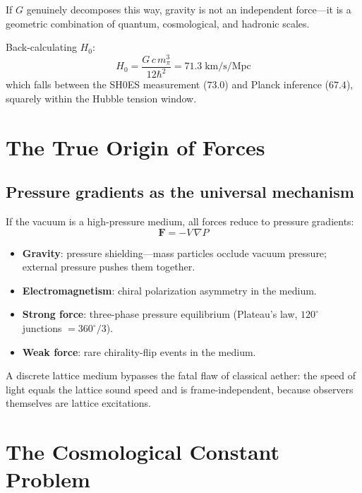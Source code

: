 \documentclass[12pt,a4paper,twocolumn]{article}
\begin{document}
If $G$ genuinely decomposes this way, gravity is not an independent force---it is a geometric combination of quantum, cosmological, and hadronic scales.

Back-calculating $H_0$:
\begin{equation}
H_0 = \frac{G\,c\,m_\pi^3}{12\hbar^2} = 71.3 \;\text{km/s/Mpc}
\end{equation}
which falls between the SH0ES measurement ($73.0$) and Planck inference ($67.4$), squarely within the Hubble tension window.


\section{The True Origin of Forces}

\subsection{Pressure gradients as the universal mechanism}

If the vacuum is a high-pressure medium, all forces reduce to pressure gradients:
\begin{equation}
\mathbf{F} = -V\,\nabla P
\end{equation}

\begin{itemize}[nosep,leftmargin=1.2em]
\item \textbf{Gravity}: pressure shielding---mass particles occlude vacuum pressure; external pressure pushes them together.
\item \textbf{Electromagnetism}: chiral polarization asymmetry in the medium.
\item \textbf{Strong force}: three-phase pressure equilibrium (Plateau's law, $120^\circ$ junctions $=360^\circ/3$).
\item \textbf{Weak force}: rare chirality-flip events in the medium.
\end{itemize}

A discrete lattice medium bypasses the fatal flaw of classical aether: the speed of light equals the lattice sound speed and is frame-independent, because observers themselves are lattice excitations.


\section{The Cosmological Constant Problem}
\end{document}
